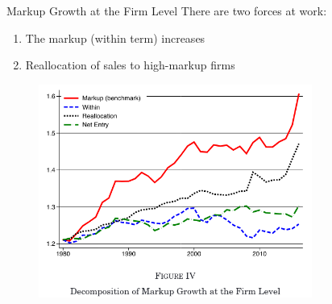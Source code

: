 \documentclass{beamer}
\begin{document}
  \begin{frame}{Markup Growth at the Firm Level}
    There are two forces at work:
    \begin{enumerate}
    \item The markup (within term) increases
      \item Reallocation of sales to high-markup firms
    \end{enumerate}
    \begin{figure}[htp]
      \centering
      \includegraphics[width=0.8\textwidth, keepaspectratio=true]{fig4.png}
    \end{figure}
  \end{frame}
\end{document}

